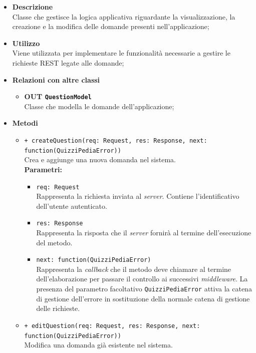 	\begin{itemize}
		\item \textbf{Descrizione} \\
		Classe che gestisce la logica applicativa riguardante la visualizzazione, la creazione e la modifica delle domande presenti nell'applicazione;
		\item \textbf{Utilizzo} \\
		Viene utilizzata per implementare le funzionalità necessarie a gestire le richieste REST legate alle domande;
		\item \textbf{Relazioni con altre classi}
			\begin{itemize}
				\item \textbf{OUT \texttt{QuestionModel}} \\
				Classe che modella le domande dell'applicazione;
			\end{itemize}
		\item \textbf{Metodi}
			\begin{itemize}
				\item \texttt{+ createQuestion(req: Request, res: Response, next: function(QuizziPediaError))} \\
				Crea e aggiunge una nuova domanda nel sistema. \\
				\textbf{Parametri:}
				\begin{itemize}
					\item \texttt{req: Request} \\
					Rappresenta la richiesta inviata al \textit{server}. Contiene l'identificativo dell'utente autenticato.
					\item \texttt{res: Response} \\
					Rappresenta la risposta che il \textit{server} fornirà al termine dell'esecuzione del metodo.
					\item \texttt{next: function(QuizziPediaError)} \\
					Rappresenta la \textit{callback} che il metodo deve chiamare al termine dell'elaborazione per passare il controllo ai successivi \textit{middleware}. La presenza del parametro facoltativo \texttt{QuizziPediaError} attiva la catena di gestione dell'errore in sostituzione della normale catena di gestione delle richieste.
				\end{itemize}
				\item \texttt{+ editQuestion(req: Request, res: Response, next: function(QuizziPediaError))} \\
				Modifica una domanda già esistente nel sistema. \\

\end{itemize}
\end{itemize}

